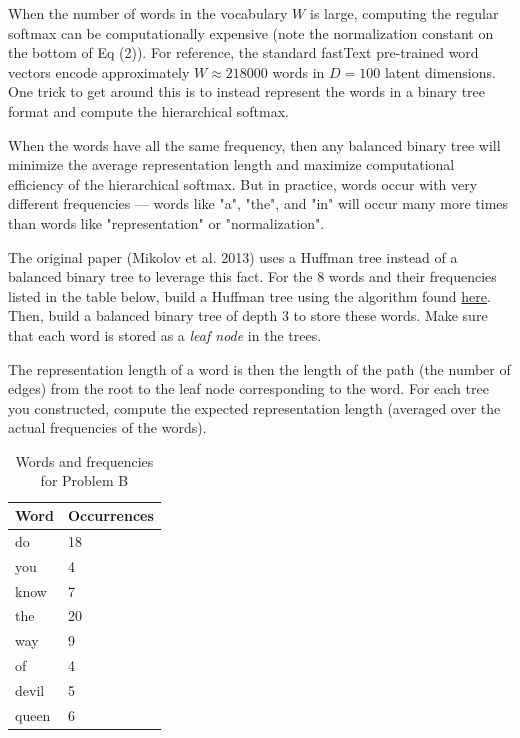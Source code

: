 \begin{solution}
\end{solution}


\problem[10]
When the number of words in the vocabulary $W$ is large, computing the regular softmax can be computationally expensive (note the normalization constant on the bottom of Eq (2)). For reference, the standard fastText pre-trained word vectors encode approximately $W \approx 218000$ words in $D=100$ latent dimensions. One trick to get around this is to instead represent the words in a binary tree format and compute the hierarchical softmax.

When the words have all the same frequency, then any balanced binary tree will minimize the average representation length and maximize computational efficiency of the hierarchical softmax. But in practice, words occur with very different frequencies --- words like "a", "the", and "in" will occur many more times than words like "representation" or "normalization".

The original paper (Mikolov et al. 2013) uses a Huffman tree instead of a balanced binary tree to leverage this fact. For the 8 words and their frequencies listed in the table below, build a Huffman tree using the algorithm found \href{https://www.geeksforgeeks.org/dsa/huffman-coding-greedy-algo-3/}{here}.
Then, build a balanced binary tree of depth 3 to store these words. 
Make sure that each word is stored as a \emph{leaf node} in the trees.

The representation length of a word is then the length of the path (the number of edges) from the root to the leaf node corresponding to the word. For each tree you constructed, compute the expected representation length (averaged over the actual frequencies of the words).

\begin{table}[]
\centering
\caption{Words and frequencies for Problem B}
\begin{tabular}{|l|l|}
\hline
Word  & Occurrences \\ \hline
do    & 18          \\
you   & 4           \\
know  & 7           \\
the   & 20          \\
way   & 9          \\
of    & 4           \\
devil & 5           \\
queen & 6           \\ \hline
\end{tabular}
\end{table}

